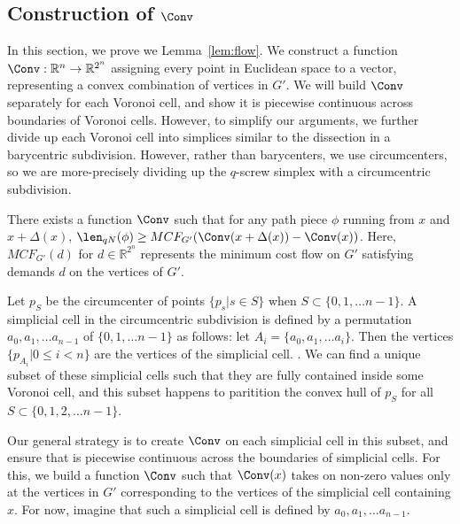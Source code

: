 \subsection{Construction of $\Conv$}

In this section, we prove we Lemma~\ref{lem:flow}. We construct a function
$\Conv:\mathbb{R}^n \rightarrow \mathbb{R}^{2^n}$ assigning every point in
Euclidean space to a vector, representing a convex combination of vertices
in $G'$. We will build $\Conv$ separately for each Voronoi cell, and show
it is piecewise continuous across boundaries of Voronoi cells. 
However, to simplify our arguments, we further divide up each Voronoi cell
into simplices similar to the dissection in a barycentric subdivision.
However, rather than barycenters, we use circumcenters, so we are
more-precisely dividing up the $q$-screw simplex with a circumcentric
subdivision. 

\begin{lemma}\label{lem:flow} There exists a function $\Conv$ such that for
any
path piece $\phi$ running from $x$ and $x+\Delta(x)$, $\len_{qN}(\phi) \geq
MCF_{G'}(\Conv(x+\Delta(x))-\Conv(x))$. Here, $MCF_{G'}(d)$ for $d \in
\mathbb{R}^{2^n}$ represents the minimum cost flow on $G'$ satisfying demands
$d$ on the vertices of $G'$.

\end{lemma}

Let $p_{S}$ be the circumcenter of points $\{p_s | s \in S\}$ when $S
\subset \{0, 1, \ldots n-1\}$. A simplicial cell in the circumcentric subdivision is
defined by a permutation $a_0, a_1, \ldots a_{n-1}$ of $\{0, 1, \ldots
n-1\}$ as follows: let
$A_i = \{a_0, a_1, \ldots a_{i}\}$. Then the vertices $\{p_{A_i} | 0 \leq i
< n\}$ are the vertices of the simplicial cell.  . We can find a unique subset of these simplicial cells
such that they are fully contained inside some Voronoi cell, and this
subset happens to paritition the convex hull of $p_S$ for all $S \subset
\{0,1,2,\ldots n-1\}$. 

Our general strategy is to create $\Conv$ on each simplicial cell in this
subset, and ensure that is piecewise continuous across the boundaries of simplicial
cells. For this, we build a function $\Conv$ such that $\Conv(x)$ takes on
non-zero values only at the vertices in $G'$ corresponding to the vertices
of the simplicial cell containing $x$. For now, imagine that such a
simplicial cell is defined by $a_0, a_1, \ldots a_{n-1}$.


